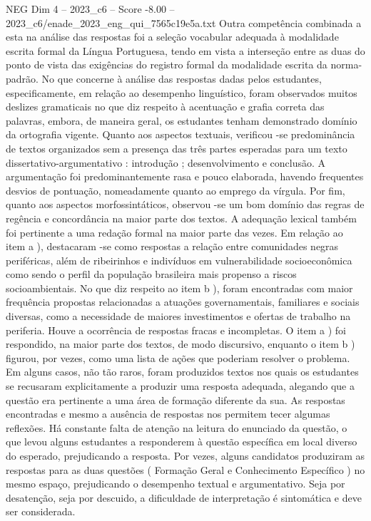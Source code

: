 \begin{textsample}{NEG Dim 4 – 2023\_c6 – Score -8.00 – 2023\_c6/enade\_2023\_eng\_qui\_7565c19e5a.txt}
Outra competência combinada a esta na análise das respostas foi a seleção vocabular adequada à modalidade escrita formal da Língua Portuguesa, tendo em vista a interseção entre as duas do ponto de vista das exigências do registro formal da modalidade escrita da norma-padrão.
No que concerne à análise das respostas dadas pelos estudantes, especificamente, em relação ao desempenho linguístico, foram observados muitos deslizes gramaticais no que diz respeito à acentuação e grafia correta das palavras, embora, de maneira geral, os estudantes tenham demonstrado domínio da ortografia vigente.
Quanto aos aspectos textuais, verificou -se predominância de textos organizados sem a presença das três partes esperadas para um texto dissertativo-argumentativo : introdução ; desenvolvimento e conclusão.
A argumentação foi predominantemente rasa e pouco elaborada, havendo frequentes desvios de pontuação, nomeadamente quanto ao emprego da vírgula.
Por fim, quanto aos aspectos morfossintáticos, observou -se um bom domínio das regras de regência e concordância na maior parte dos textos.
A adequação lexical também foi pertinente a uma redação formal na maior parte das vezes.
Em relação ao item a ), destacaram -se como respostas a relação entre comunidades negras periféricas, além de ribeirinhos e indivíduos em vulnerabilidade socioeconômica como sendo o perfil da população brasileira mais propenso a riscos socioambientais.
No que diz respeito ao item b ), foram encontradas com maior frequência propostas relacionadas a atuações governamentais, familiares e sociais diversas, como a necessidade de maiores investimentos e ofertas de trabalho na periferia.
Houve a ocorrência de respostas fracas e incompletas.
O item a ) foi respondido, na maior parte dos textos, de modo discursivo, enquanto o item b ) figurou, por vezes, como uma lista de ações que poderiam resolver o problema.
Em alguns casos, não tão raros, foram produzidos textos nos quais os estudantes se recusaram explicitamente a produzir uma resposta adequada, alegando que a questão era pertinente a uma área de formação diferente da sua.
As respostas encontradas e mesmo a ausência de respostas nos permitem tecer algumas reflexões.
Há constante falta de atenção na leitura do enunciado da questão, o que levou alguns estudantes a responderem à questão específica em local diverso do esperado, prejudicando a resposta.
Por vezes, alguns candidatos produziram as respostas para as duas questões ( Formação Geral e Conhecimento Específico ) no mesmo espaço, prejudicando o desempenho textual e argumentativo.
Seja por desatenção, seja por descuido, a dificuldade de interpretação é sintomática e deve ser considerada.

\end{textsample}
